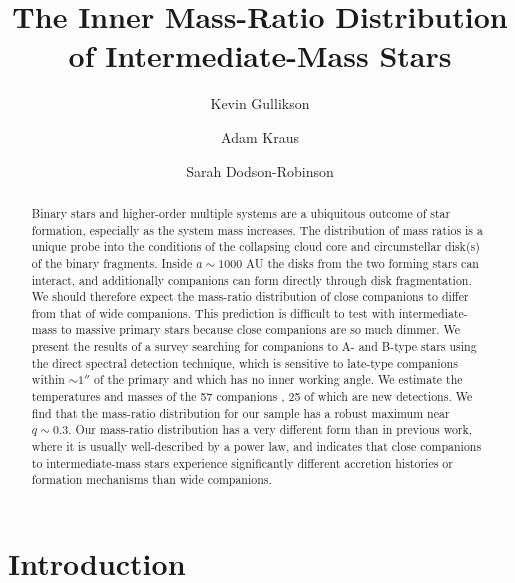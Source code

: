 \documentclass{emulateapj}
\begin{document}
\title{The Inner Mass-Ratio Distribution of Intermediate-Mass Stars}

\author{Kevin Gullikson }
\author{Adam Kraus }
\author{Sarah Dodson-Robinson }



\begin{abstract}
Binary stars and higher-order multiple systems are a ubiquitous outcome of star formation, especially as the system mass increases. The distribution of mass ratios is a unique probe into the conditions of the collapsing cloud core and circumstellar disk(s) of the binary fragments. Inside $a \sim 1000$ AU the disks from the two forming stars can interact, and additionally companions can form directly through disk fragmentation. We should therefore expect the mass-ratio distribution of close companions to differ from that of wide companions. This prediction is difficult to test with intermediate-mass to massive primary stars because close companions are so much dimmer. We present the results of a survey searching for companions to A- and B-type stars using the direct spectral detection technique, which is sensitive to late-type companions within $\sim 1''$ of the primary and which has no inner working angle. We estimate the temperatures and masses of the 57 companions , 25 of which are new detections. We find that the mass-ratio distribution for our sample has a robust maximum near $q \sim 0.3$. Our mass-ratio distribution has a very different form than in previous work, where it is usually well-described by a power law, and indicates that close companions to intermediate-mass stars experience significantly different accretion histories or formation mechanisms than wide companions.
\end{abstract}

\maketitle

\section{Introduction}
\end{document}
